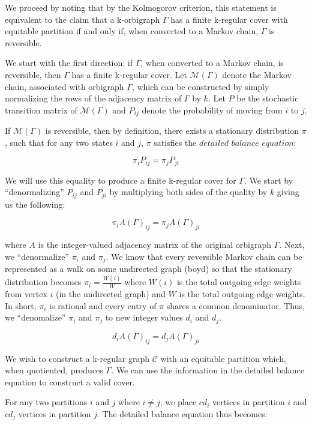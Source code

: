 We proceed by noting that by the Kolmogorov criterion, this statement is equivalent to the claim that a k-orbigraph $\Gamma$ has a finite k-regular cover with equitable partition if and only if, when converted to a Markov chain, $\Gamma$ is reversible.

We start with the first direction: if $\Gamma$, when converted to a Markov chain, is reversible, then $\Gamma$ has a finite k-regular cover. Let $\mathcal{M}(\Gamma)$ denote the Markov chain, associated with orbigraph $\Gamma$, which can be constructed by simply normalizing the rows of the adjacency matrix of $\Gamma$ by $k$. Let $P$ be the stochastic transition matrix of $\mathcal{M}(\Gamma)$ and $P_{ij}$ denote the probability of moving from $i$ to $j$.

If $\mathcal{M}(\Gamma)$ is reversible, then by definition, there exists a stationary distribution $\pi$, such that for any two states $i$ and $j$, $\pi$ satisfies the $\textit{detailed balance equation}$:

$$
\pi_i P_{ij} = \pi_j P_{ji}
$$

We will use this equality to produce a finite k-regular cover for $\Gamma$. We start by ``denormalizing'' $P_{ij}$ and $P_{ji}$ by multiplying both sides of the quality by $k$ giving us the following:

$$
\pi_i A(\Gamma)_{ij} = \pi_j A(\Gamma)_{ji}
$$

where $A$ is the integer-valued adjacency matrix of the original orbigraph $\Gamma$. Next, we ``denormalize'' $\pi_i$ and $\pi_j$. We know that every reversible Markov chain can be represented as a walk on some undirected graph (boyd) so that the stationary distribution becomes $\pi_i = \frac{W(i)}{W}$ where $W(i)$ is the total outgoing edge weights from vertex $i$ (in the undirected graph) and $W$ is the total outgoing edge weights. In short, $\pi_i$ is rational and every entry of $\pi$ shares a common denominator. Thus, we ``denomalize'' $\pi_i$ and $\pi_j$ to new integer values $d_i$ and $d_j$.

$$
d_i A(\Gamma)_{ij} = d_j A(\Gamma)_{ji}
$$

We wish to construct a k-regular graph $\mathcal{C}$ with an equitable partition which, when quotiented, produces $\Gamma$. We can use the information in the detailed balance equation to construct a valid cover.

For any two partitions $i$ and $j$ where $i \neq j$, we place $c d_i$ vertices in partition $i$ and $c d_j$ vertices in partition $j$. The detailed balance equation thus becomes:

